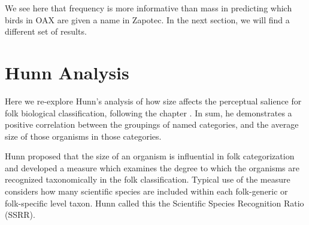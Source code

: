 \documentclass[10pt,letterpaper]{article}
\begin{document}
We see here that frequency is more informative than mass in predicting which birds in OAX are given a name in Zapotec. In the next section, we will find a different set of results.

\section{Hunn Analysis}
Here we re-explore Hunn's analysis of how size affects the perceptual salience for folk biological classification, following the chapter \cite{hunn1999size}. In sum, he demonstrates a positive correlation between the groupings of named categories, and the average size of those organisms in those categories.

Hunn proposed that the size of an organism is influential in folk categorization and developed a measure which examines the degree to which the organisms are recognized taxonomically in the folk classification. Typical use of the measure considers how many scientific species are included within each folk-generic or folk-specific level taxon. Hunn called this the Scientific Species Recognition Ratio (SSRR).
\end{document}
